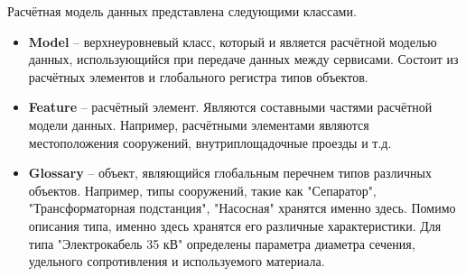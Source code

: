 Расчётная модель данных представлена следующими классами.
\begin{itemize}
	\item \textbf{Model} -- верхнеуровневый класс, который и является расчётной моделью данных, использующийся
	при передаче данных между сервисами. Состоит из расчётных элементов и глобального регистра типов объектов.
	\item {
		\textbf{Feature} -- расчётный элемент. Являются составными частями расчётной модели данных. Например, расчётными
		элементами являются местоположения сооружений, внутриплощадочные проезды и т.д.
	}
	\item {
		\textbf{Glossary} -- объект, являющийся глобальным перечнем типов различных объектов.
		Например, типы сооружений, такие как "Сепаратор", "Трансформаторная подстанция", "Насосная" хранятся именно
		здесь. Помимо описания типа, именно здесь хранятся его различные характеристики. Для типа "Электрокабель 35 кВ"
		определены параметра диаметра сечения, удельного сопротивления и используемого материала.
	}
\end{itemize}